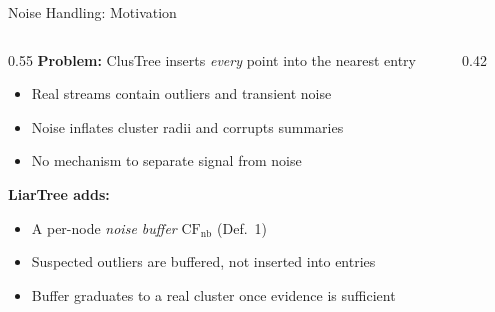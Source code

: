 \documentclass[aspectratio=169]{beamer}
\begin{document}
\begin{frame}{Noise Handling: Motivation}
\begin{columns}[T]
  \begin{column}{0.55\textwidth}
    \textbf{Problem:} ClusTree inserts \emph{every} point into the nearest entry
    \begin{itemize}
      \item Real streams contain outliers and transient noise
      \item Noise inflates cluster radii and corrupts summaries
      \item No mechanism to separate signal from noise
    \end{itemize}
    \vspace{0.35cm}
    \textbf{LiarTree adds:}
    \begin{itemize}
      \item A per-node \emph{noise buffer} $\mathrm{CF}_\text{nb}$ (Def.\ 1)
      \item Suspected outliers are buffered, not inserted into entries
      \item Buffer graduates to a real cluster once evidence is sufficient
    \end{itemize}
  \end{column}
  \begin{column}{0.42\textwidth}
    \centering
    \vspace{0.5cm}
  \end{column}
\end{columns}
\end{frame}
\end{document}
